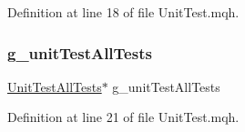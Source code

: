 Definition at line 18 of file Unit\+Test.\+mqh.

\mbox{\label{_unit_test_8mqh_ac4c2170c0847569eb60570a7d2376a50}} 
\subsubsection{\texorpdfstring{g\+\_\+unit\+Test\+All\+Tests}{g\_unitTestAllTests}}
{\footnotesize\ttfamily \mbox{\hyperlink{class_unit_test_all_tests}{Unit\+Test\+All\+Tests}}$\ast$ g\+\_\+unit\+Test\+All\+Tests}



Definition at line 21 of file Unit\+Test.\+mqh.

